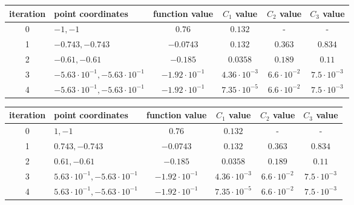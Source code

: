 \documentclass[12pt]{article}
\begin{document}
	\begin{table}[H]
		\begin{tabularx}{\textwidth}{c|X|c|c|c|c|}
			iteration & point coordinates & function value & $C_1$ value & $C_2$ value & $C_3$ value\\
			\hline	
			0 & $-1, -1$ & $0.76$ & $0.132$ & - & - \\
			\hline					
			1 & $-0.743, -0.743$ & $-0.0743$ & $0.132$ & $0.363$ & $0.834$ \\ 
			\hline 
			2 & $-0.61, -0.61$ & $-0.185$ & $0.0358$ & $0.189$ & $0.11$ \\ 
			\hline
			3 & $-5.63\cdot10^{-1}, -5.63\cdot10^{-1}$  & $-1.92\cdot10^{-1}$ & $4.36\cdot10^{-3}$ & $6.6\cdot10^{-2}$ & $7.5\cdot10^{-3}$ \\ 
			\hline
			4 & $-5.63\cdot10^{-1}, -5.63\cdot10^{-1}$  & $-1.92\cdot10^{-1}$ &
			$7.35\cdot10^{-5}$ & $6.6\cdot10^{-2}$ & $7.5\cdot10^{-3}$ \\ \hline
		\end{tabularx}		 
	\end{table}
	\begin{table}[H]
		\begin{tabularx}{\textwidth}{c|X|c|c|c|c|}
			iteration & point coordinates & function value & $C_1$ value & $C_2$ value & $C_3$ value\\
			\hline	
			0 & $1, -1$ & $0.76$ & $0.132$ & - & - \\
			\hline					
			1 & $0.743, -0.743$ & $-0.0743$ & $0.132$ & $0.363$ & $0.834$ \\ 
			\hline 
			2 & $0.61, -0.61$ & $-0.185$ & $0.0358$ & $0.189$ & $0.11$ \\ 
			\hline
			3 & $5.63\cdot10^{-1}, -5.63\cdot10^{-1}$  & $-1.92\cdot10^{-1}$ & $4.36\cdot10^{-3}$ & $6.6\cdot10^{-2}$ & $7.5\cdot10^{-3}$ \\ 
			\hline
			4 & $5.63\cdot10^{-1}, -5.63\cdot10^{-1}$  & $-1.92\cdot10^{-1}$ &
			$7.35\cdot10^{-5}$ & $6.6\cdot10^{-2}$ & $7.5\cdot10^{-3}$ \\ \hline
		\end{tabularx}		 
	\end{table}
	
\end{document}
